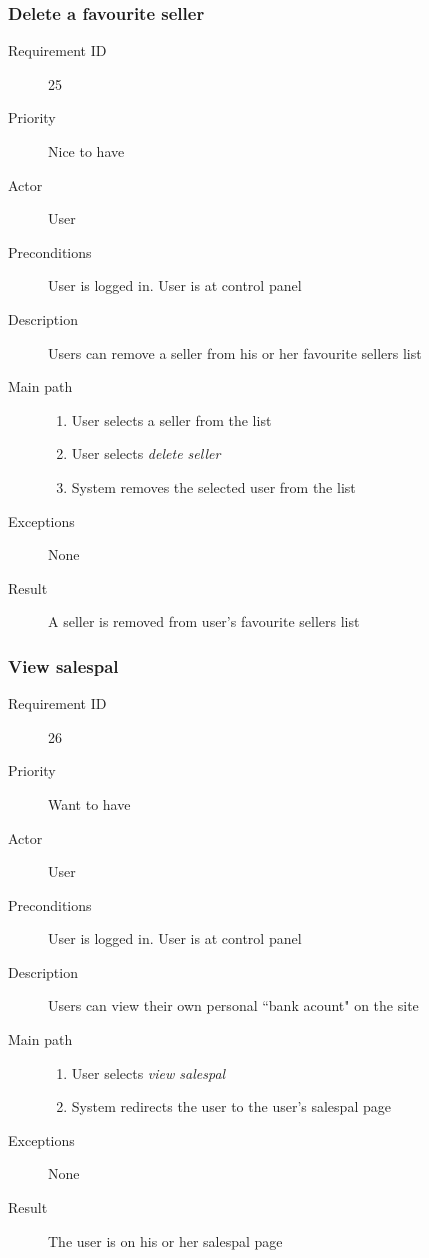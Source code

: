 		\subsubsection{Delete a favourite seller}
			\begin{description}
				\item[Requirement ID] 25
				\item[Priority] Nice to have
				\item[Actor] User
				\item[Preconditions] User is logged in. User is at control panel
				\item[Description] Users can remove a seller from his or her favourite sellers list
				\item[Main path]
 					\begin{enumerate}
						\item User selects a seller from the list
						\item User selects \emph{delete seller} 
						\item System removes the selected user from the list
					\end{enumerate}
				\item[Exceptions] None
				\item[Result] A seller is removed from user's favourite sellers list
			\end{description}
		\subsubsection{View salespal}
			\begin{description}
				\item[Requirement ID] 26
				\item[Priority] Want to have
				\item[Actor] User
				\item[Preconditions] User is logged in. User is at control panel
				\item[Description] Users can view their own personal ``bank acount" on the site
				\item[Main path]
 					\begin{enumerate}
						\item User selects \emph{view salespal}
						\item System redirects the user to the user's salespal page
					\end{enumerate}
				\item[Exceptions] None
				\item[Result] The user is on his or her salespal page
			\end{description}
